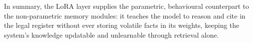 In summary, the LoRA layer supplies the parametric, behavioural counterpart to the non-parametric memory modules: it teaches the model to reason and cite in the legal register without ever storing volatile facts in its weights, keeping the system's knowledge updatable and unlearnable through retrieval alone.
